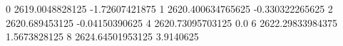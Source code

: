 0 2619.0048828125 -1.72607421875
1 2620.400634765625 -0.330322265625
2 2620.689453125 -0.04150390625
4 2620.73095703125 0.0
6 2622.29833984375 1.5673828125
8 2624.64501953125 3.9140625

